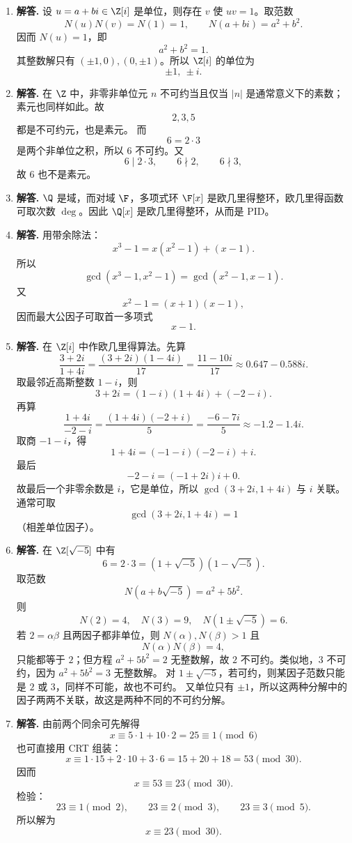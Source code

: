 \begin{enumerate}[label=\textbf{\arabic*.}, leftmargin=*, itemsep=1em]
  \item \textbf{解答.} 设 $u=a+bi\in\Z[i]$ 是单位，则存在 $v$ 使 $uv=1$。取范数
  \[
  N(u)N(v)=N(1)=1,\qquad N(a+bi)=a^2+b^2.
  \]
  因而 $N(u)=1$，即
  \[
  a^2+b^2=1.
  \]
  其整数解只有 $(\pm1,0),(0,\pm1)$。所以 $\Z[i]$ 的单位为
  \[
  \pm1,\ \pm i.
  \]

  \item \textbf{解答.} 在 $\Z$ 中，非零非单位元 $n$ 不可约当且仅当 $|n|$ 是通常意义下的素数；素元也同样如此。故
  \[
  2,3,5
  \]
  都是不可约元，也是素元。  
  而
  \[
  6=2\cdot3
  \]
  是两个非单位之积，所以 $6$ 不可约。又
  \[
  6\mid 2\cdot3,\qquad 6\nmid 2,\qquad 6\nmid 3,
  \]
  故 $6$ 也不是素元。

  \item \textbf{解答.} $\Q$ 是域，而对域 $\F$，多项式环 $\F[x]$ 是欧几里得整环，欧几里得函数可取次数 $\deg$。因此 $\Q[x]$ 是欧几里得整环，从而是 PID。

  \item \textbf{解答.} 用带余除法：
  \[
  x^3-1=x(x^2-1)+(x-1).
  \]
  所以
  \[
  \gcd(x^3-1,x^2-1)=\gcd(x^2-1,x-1).
  \]
  又
  \[
  x^2-1=(x+1)(x-1),
  \]
  因而最大公因子可取首一多项式
  \[
  x-1.
  \]

  \item \textbf{解答.} 在 $\Z[i]$ 中作欧几里得算法。先算
  \[
  \frac{3+2i}{1+4i}=\frac{(3+2i)(1-4i)}{17}=\frac{11-10i}{17}\approx 0.647-0.588i.
  \]
  取最邻近高斯整数 $1-i$，则
  \[
  3+2i=(1-i)(1+4i)+(-2-i).
  \]
  再算
  \[
  \frac{1+4i}{-2-i}=\frac{(1+4i)(-2+i)}{5}=\frac{-6-7i}{5}\approx -1.2-1.4i.
  \]
  取商 $-1-i$，得
  \[
  1+4i=(-1-i)(-2-i)+i.
  \]
  最后
  \[
  -2-i=(-1+2i)i+0.
  \]
  故最后一个非零余数是 $i$，它是单位，所以 $\gcd(3+2i,1+4i)$ 与 $i$ 关联。通常可取
  \[
  \gcd(3+2i,1+4i)=1
  \]
  （相差单位因子）。

  \item \textbf{解答.} 在 $\Z[\sqrt{-5}]$ 中有
  \[
  6=2\cdot3=(1+\sqrt{-5})(1-\sqrt{-5}).
  \]
  取范数
  \[
  N(a+b\sqrt{-5})=a^2+5b^2.
  \]
  则
  \[
  N(2)=4,\quad N(3)=9,\quad N(1\pm\sqrt{-5})=6.
  \]
  若 $2=\alpha\beta$ 且两因子都非单位，则 $N(\alpha),N(\beta)>1$ 且
  \[
  N(\alpha)N(\beta)=4,
  \]
  只能都等于 $2$；但方程 $a^2+5b^2=2$ 无整数解，故 $2$ 不可约。类似地，$3$ 不可约，因为 $a^2+5b^2=3$ 无整数解。  
  对 $1\pm\sqrt{-5}$，若可约，则某因子范数只能是 $2$ 或 $3$，同样不可能，故也不可约。  
  又单位只有 $\pm1$，所以这两种分解中的因子两两不关联，故这是两种不同的不可约分解。

  \item \textbf{解答.} 由前两个同余可先解得
  \[
  x\equiv 5\cdot1+10\cdot2=25\equiv1\pmod 6
  \]
  也可直接用 CRT 组装：
  \[
  x\equiv 1\cdot15+2\cdot10+3\cdot6=15+20+18=53\pmod{30}.
  \]
  因而
  \[
  x\equiv 53\equiv 23\pmod{30}.
  \]
  检验：
  \[
  23\equiv1\pmod2,\qquad 23\equiv2\pmod3,\qquad 23\equiv3\pmod5.
  \]
  所以解为
  \[
  x\equiv 23\pmod{30}.
  \]


\end{enumerate}
